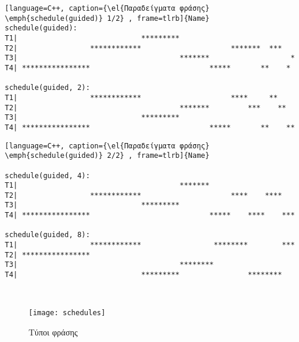 \begin{lstlisting}[language=C++, caption={\el{Παραδείγματα φράσης} \emph{schedule(guided)} 1/2} , frame=tlrb]{Name}
schedule(guided):
T1|                             *********                       
T2|                 ************                     *******  ***   
T3|                                      *******                   *
T4| ****************                            *****       **    * 

schedule(guided, 2): 
T1|                 ************                     ****     **    
T2|                                      *******         ***    **  
T3|                             *********                           
T4| ****************                            *****       **    **
\end{lstlisting}
\begin{lstlisting}[language=C++, caption={\el{Παραδείγματα φράσης} \emph{schedule(guided)} 2/2} , frame=tlrb]{Name}

schedule(guided, 4):   
T1|                                      *******                    
T2|                 ************                     ****    ****   
T3|                             *********                           
T4| ****************                            *****    ****    ***

schedule(guided, 8):   
T1|                 ************                 ********        ***
T2| ****************                                                
T3|                                      ********                   
T4|                             *********                ********
\end{lstlisting}
     
\ \\
\begin{figure}[h]
\texttt{[image: schedules]}
\centering
\captionsetup{justification=centering, singlelinecheck=false}
	\caption{Τύποι φράσης }
\label{fig:schedules}
\end{figure}

\clearpage
